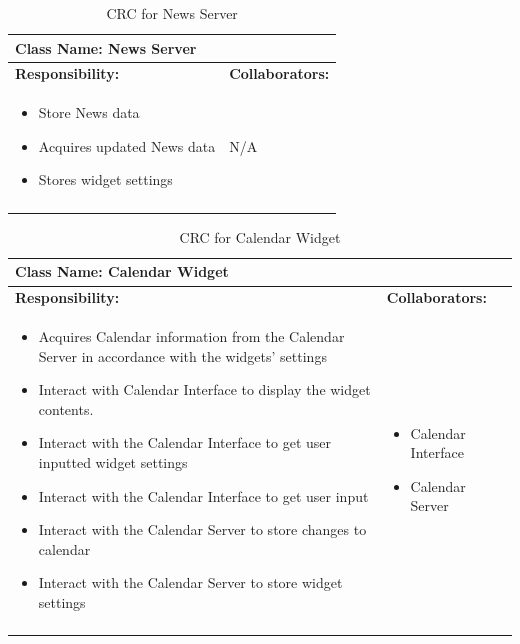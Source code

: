 \documentclass[]{article}
\begin{document}
\begin{longtable}{| p{} | p{} |}
	\hline
	\multicolumn{2}{|l|}{\textbf{Class Name: News Server}} \\
	\hline
	\textbf{Responsibility:} & \textbf{Collaborators:} \\
	\hline
	\begin{itemize}
		\item Store News data
		\item Acquires updated News data
		\item Stores widget settings
    \end{itemize} & \newline \newline  N/A \\
	\hline
	\caption{CRC for News Server}
\end{longtable}
\newpage
\begin{longtable}{| p{} | p{} |}
	\hline
	\multicolumn{2}{|l|}{\textbf{Class Name: Calendar Widget}} \\
	\hline
	\textbf{Responsibility:} & \textbf{Collaborators:} \\
	\hline
	\begin{itemize}
        \item Acquires Calendar information from the Calendar Server in accordance with the widgets' settings
		\item Interact with Calendar Interface to display the widget contents.
		\item Interact with the Calendar Interface to get user inputted widget settings
		\item Interact with the Calendar Interface to get user input
		\item Interact with the Calendar Server to store changes to calendar
		\item Interact with the Calendar Server to store widget settings
    \end{itemize} & 
	\begin{itemize}
		\item Calendar Interface
        \item Calendar Server
	\end{itemize} \\
	\hline
	\caption{CRC for Calendar Widget}
\end{longtable}
\end{document}
